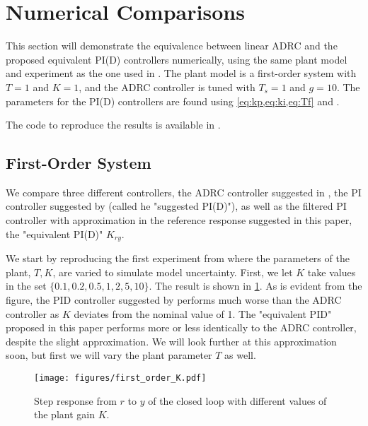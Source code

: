 \documentclass[letterpaper, 10 pt, conference]{ieeeconf}
\begin{document}
\section{Numerical Comparisons} \label{sec:numerical}
This section will demonstrate the equivalence between linear ADRC and the proposed equivalent PI(D) controllers numerically, using the same plant model and experiment as the one used in \cite{herbst2013simulative}. The plant model is a first-order system with $T = 1$ and $K = 1$, and the ADRC controller is tuned with $T_s = 1$ and $g = 10$. The parameters for the PI(D) controllers are found using \cref{eq:kp,eq:ki,eq:Tf} and .

The code to reproduce the results is available in \cite{repo}.

\subsection{First-Order System}

We compare three different controllers, the ADRC controller suggested in \cite{herbst2013simulative}, the PI controller suggested by \cite{herbst2013simulative} (called he "suggested PI(D)"), as well as the filtered PI controller with approximation in the reference response suggested in this paper, the "equivalent PI(D)" $K_{ry}$.

We start by reproducing the first experiment from \cite{herbst2013simulative} where the parameters of the plant, $T,K$, are varied to simulate model uncertainty. First, we let $K$ take values in the set $\{0.1, 0.2, 0.5, 1, 2, 5, 10\}$. The result is shown in \cref{fig:first_order_K}. As is evident from the figure, the PID controller suggested by \cite{herbst2013simulative} performs much worse than the ADRC controller as $K$ deviates from the nominal value of 1. The "equivalent PID" proposed in this paper performs more or less identically to the ADRC controller, despite the slight approximation. We will look further at this approximation soon, but first we will vary the plant parameter $T$ as well.

\begin{figure}[h]
	\centering
	\texttt{[image: figures/first\_order\_K.pdf]}
	\caption{Step response from $r$ to $y$  of the closed loop with different values of the plant gain $K$.}
	\label{fig:first_order_K}
\end{figure}
\end{document}
